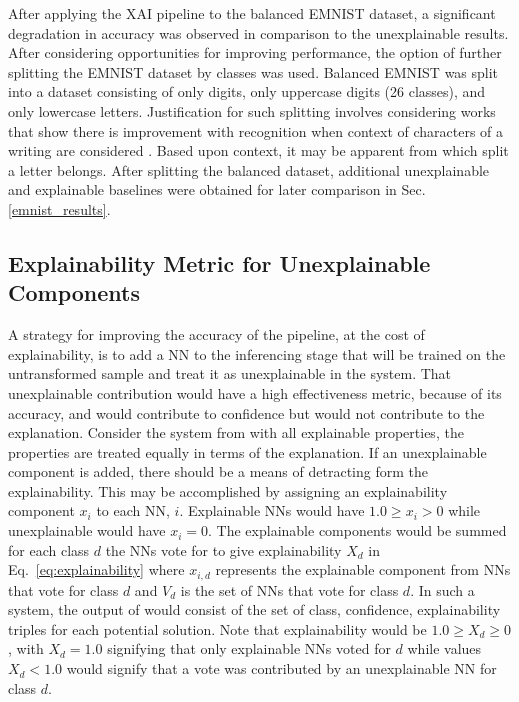 \documentclass[conference]{IEEEtran}
\begin{document}
After applying the XAI pipeline to the balanced EMNIST dataset, a significant
degradation in accuracy was observed in comparison to the unexplainable results.
After considering opportunities for improving performance, the option of further
splitting the EMNIST dataset by classes was used.  Balanced EMNIST was split
into a dataset consisting of only digits, only uppercase digits (26 classes),
and only lowercase letters.  Justification for such splitting involves
considering works that show there is improvement with recognition when context
of characters of a writing are considered \cite{506792}.  Based upon context, it
may be apparent from which split a letter belongs. After splitting the balanced
dataset, additional unexplainable and explainable baselines were obtained for
later comparison in Sec. \ref{emnist_results}.

\subsection{Explainability Metric for Unexplainable Components}

A strategy for improving the accuracy of the pipeline, at the cost of
explainability, is to add a NN to the inferencing stage that will be trained on
the untransformed sample and treat it as unexplainable in the system.  That
unexplainable contribution would have a high effectiveness metric, because of
its accuracy, and would contribute to confidence but would not contribute to the
explanation.  Consider the system from \cite{whitten21} with all explainable
properties, the properties are treated equally in terms of the explanation. If
an unexplainable component is added, there should be a means of detracting form
the explainability. This may be accomplished by assigning an explainability
component $x_i$ to each NN, $i$.  Explainable NNs would have $1.0 \geq x_i > 0$
while unexplainable would have $x_i = 0$.  The explainable components would be
summed for each class $d$ the NNs vote for to give explainability $X_d$ in
Eq.~\ref{eq:explainability} where $x_{i,d}$ represents the explainable component
from NNs that vote for class $d$ and $V_d$ is the set of NNs that vote for class
$d$.  In such a system, the output of would consist of the set of class,
confidence, explainability triples for each potential solution.  Note that
explainability would be $1.0 \geq X_d \geq 0$, with $X_d = 1.0$ signifying that
only explainable NNs voted for $d$ while values $X_d < 1.0$ would signify that a
vote was contributed by an unexplainable NN for class $d$.
\end{document}
